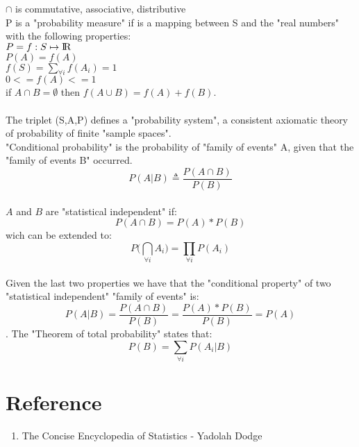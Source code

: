 \documentclass[10pt,a4paper]{book}
\newcommand\tab[1][1cm]{\hspace*{#1}}
\begin{document}
		\tab $\cap$ is commutative, associative, distributive\\
		P is a "probability measure" if is a mapping between S and the "real numbers" with the following properties:\\
		\tab $P = f: S \mapsto {\rm I\!R}$\\
		\tab $P(A) = f(A)$\\
		\tab $f(S) = \sum_{\forall i}{f(A_i)} = 1$\\
		\tab $0 <= f(A) <= 1$\\
		\tab if $A \cap B = \emptyset$ then $f(A \cup B) = f(A) + f(B).$\\
		\\
		The triplet (S,A,P) defines a "probability system", a consistent axiomatic theory of probability of finite "sample spaces".
		\\
		"Conditional probability" is the probability of "family of events" A, given that the "family of events B" occurred.\\
		$$P(A|B) \triangleq \frac{P(A \cap B)}{P(B)}$$\\
		$A$ and $B$ are "statistical independent" if:\\
		$$P(A \cap B) = P(A)*P(B)$$
		wich can be extended to:\\
		$$ P\big(\bigcap_{\forall i}{ A_i}\big) = \prod_{\forall i}{P(A_i)} $$\\
		Given the last two properties we have that the "conditional property" of two "statistical independent" "family of events" is:\\
		$$ P(A|B) = \frac{P(A \cap B)}{P(B)} = \frac{P(A)*P(B)}{P(B)} = P(A) $$.
		The "Theorem of total probability" states that:\\
		$$P(B) = \sum_{\forall i}{P(A_i|B)}$$
		
		\section{Reference}
		\begin{enumerate}
			\item {The Concise Encyclopedia of Statistics - Yadolah Dodge}
		\end{enumerate}
\end{document}
